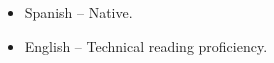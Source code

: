 \documentclass[9pt,a4paper]{altacv}
\begin{document}

\begin{itemize}
    \item Spanish -- Native.
    \item English -- Technical reading proficiency.
\end{itemize}

\clearpage

\end{document}
